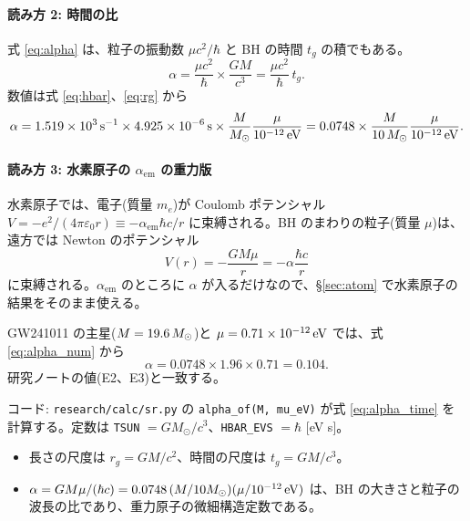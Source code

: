 \paragraph{読み方 2: 時間の比}
式 \eqref{eq:alpha} は、粒子の振動数 $\mu c^2/\hbar$ と BH の時間 $t_g$ の積でもある。
\begin{equation}
\alpha=\frac{\mu c^2}{\hbar}\times\frac{GM}{c^3}=\frac{\mu c^2}{\hbar}\,t_g.
\label{eq:alpha_time}
\end{equation}
数値は式 \eqref{eq:hbar}、\eqref{eq:rg} から
\begin{equation}
\alpha=1.519\times10^{3}\,\mathrm{s}^{-1}\times4.925\times10^{-6}\,\mathrm{s}\times\frac{M}{M_\odot}\frac{\mu}{10^{-12}\,\mathrm{eV}}
=0.0748\times\frac{M}{10\,M_\odot}\frac{\mu}{10^{-12}\,\mathrm{eV}}.
\label{eq:alpha_num}
\end{equation}

\paragraph{読み方 3: 水素原子の $\alpha_\mathrm{em}$ の重力版}
水素原子では、電子(質量 $m_e$)が Coulomb ポテンシャル $V=-e^2/(4\pi\varepsilon_0r)\equiv-\alpha_\mathrm{em}\hbar c/r$ に束縛される。BH のまわりの粒子(質量 $\mu$)は、遠方では Newton のポテンシャル
\begin{equation}
V(r)=-\frac{GM\mu}{r}=-\alpha\frac{\hbar c}{r}
\label{eq:Vgrav}
\end{equation}
に束縛される。$\alpha_\mathrm{em}$ のところに $\alpha$ が入るだけなので、\S\ref{sec:atom} で水素原子の結果をそのまま使える。

\begin{numcheck}
GW241011 の主星($M=19.6\,M_\odot$)と $\mu=0.71\times10^{-12}\,\mathrm{eV}$ では、式 \eqref{eq:alpha_num} から
\[
\alpha=0.0748\times1.96\times0.71=0.104.
\]
研究ノートの値(E2、E3)と一致する。
\end{numcheck}

\begin{tocode}
コード: \texttt{research/calc/sr.py} の \texttt{alpha\_of(M, mu\_eV)} が式 \eqref{eq:alpha_time} を計算する。定数は \texttt{TSUN} $=GM_\odot/c^3$、\texttt{HBAR\_EVS} $=\hbar$ [eV s]。
\end{tocode}

\begin{summary}
\begin{itemize}
\item 長さの尺度は $r_g=GM/c^2$、時間の尺度は $t_g=GM/c^3$。
\item $\alpha=GM\mu/(\hbar c)=0.0748\,(M/10M_\odot)(\mu/10^{-12}\,\mathrm{eV})$ は、BH の大きさと粒子の波長の比であり、重力原子の微細構造定数である。
\end{itemize}
\end{summary}
